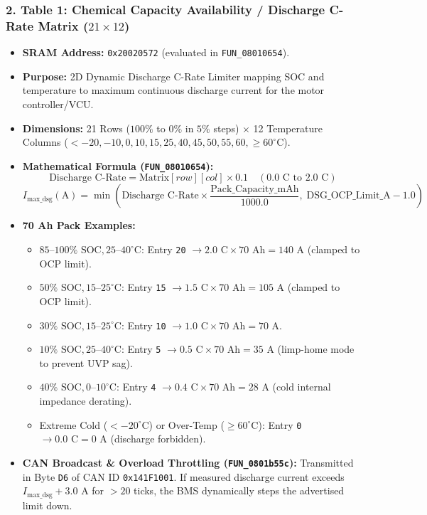 \documentclass[10pt,a4paper]{article}
\begin{document}
\subsubsection{2. Table 1: Chemical Capacity Availability / Discharge C-Rate Matrix ($21 \times 12$)}
\begin{itemize}
    \item \textbf{SRAM Address:} \texttt{0x20020572} (evaluated in \texttt{FUN\_08010654}).
    \item \textbf{Purpose:} 2D Dynamic Discharge C-Rate Limiter mapping SOC and temperature to maximum continuous discharge current for the motor controller/VCU.
    \item \textbf{Dimensions:} 21 Rows ($100\%$ to $0\%$ in $5\%$ steps) $\times$ 12 Temperature Columns ($<-20, -10, 0, 10, 15, 25, 40, 45, 50, 55, 60, \ge 60^\circ\text{C}$).
    \item \textbf{Mathematical Formula (\texttt{FUN\_08010654}):}
    \begin{equation}
        \text{Discharge C-Rate} = \text{Matrix}[row][col] \times 0.1 \quad (0.0\text{ C to }2.0\text{ C})
    \end{equation}
    \begin{equation}
        I_{\text{max\_dsg}} (\text{A}) = \min\!\left(\text{Discharge C-Rate} \times \frac{\text{Pack\_Capacity\_mAh}}{1000.0},\; \text{DSG\_OCP\_Limit\_A} - 1.0\right)
    \end{equation}
    \item \textbf{70 Ah Pack Examples:}
    \begin{itemize}
        \item $85\text{--}100\%\text{ SOC}, 25\text{--}40^\circ\text{C}$: Entry \texttt{20} $\rightarrow 2.0\text{ C} \times 70\text{ Ah} = 140\text{ A}$ (clamped to OCP limit).
        \item $50\%\text{ SOC}, 15\text{--}25^\circ\text{C}$: Entry \texttt{15} $\rightarrow 1.5\text{ C} \times 70\text{ Ah} = 105\text{ A}$ (clamped to OCP limit).
        \item $30\%\text{ SOC}, 15\text{--}25^\circ\text{C}$: Entry \texttt{10} $\rightarrow 1.0\text{ C} \times 70\text{ Ah} = 70\text{ A}$.
        \item $10\%\text{ SOC}, 25\text{--}40^\circ\text{C}$: Entry \texttt{5} $\rightarrow 0.5\text{ C} \times 70\text{ Ah} = 35\text{ A}$ (limp-home mode to prevent UVP sag).
        \item $40\%\text{ SOC}, 0\text{--}10^\circ\text{C}$: Entry \texttt{4} $\rightarrow 0.4\text{ C} \times 70\text{ Ah} = 28\text{ A}$ (cold internal impedance derating).
        \item Extreme Cold ($<-20^\circ\text{C}$) or Over-Temp ($\ge 60^\circ\text{C}$): Entry \texttt{0} $\rightarrow 0.0\text{ C} = 0\text{ A}$ (discharge forbidden).
    \end{itemize}
    \item \textbf{CAN Broadcast \& Overload Throttling (\texttt{FUN\_0801b55c}):} Transmitted in Byte \texttt{D6} of CAN ID \texttt{0x141F1001}. If measured discharge current exceeds $I_{\text{max\_dsg}} + 3.0\text{ A}$ for $>20$ ticks, the BMS dynamically steps the advertised limit down.
\end{itemize}
\end{document}
